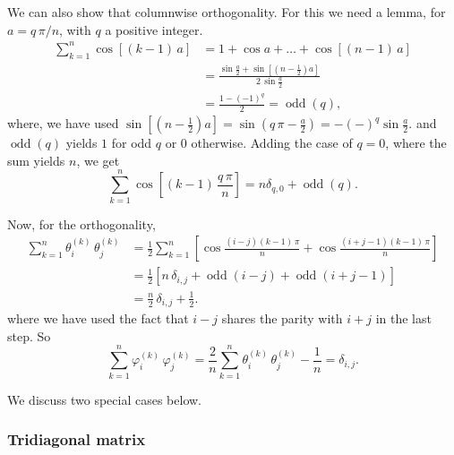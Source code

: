 \documentclass[reprint]{revtex4-1}
\begin{document}
{We can also show that columnwise orthogonality.
%
For this we need a lemma, for $a = q \, \pi/n$,
with $q$ a positive integer.
$$
\begin{aligned}
\sum_{k = 1}^n \cos[(k - 1) \, a]
&=
1 + \cos a + \dots + \cos[(n - 1) \, a]
\\
&=
\frac{
      \sin\frac a 2
    + \sin \left[ \left( n - \frac 1 2 \right) a \right]
    }
    {
      2 \, \sin \frac a 2
    }
\\
&=
\frac{ 1 - (-1)^q } { 2 }
= \operatorname{odd}(q),
\end{aligned}
$$
%
where, we have used
$\sin \left[ \left( n - \frac 1 2 \right) a \right]
= \sin \left( q \, \pi - \frac a 2 \right)
= -(-)^q\sin\frac a 2.$
%
and $\operatorname{odd}(q)$
yields $1$ for odd $q$ or $0$ otherwise.
%
Adding the case of $q = 0$, where the sum yields $n$,
we get
$$
\sum_{k = 1}^n \cos\left[(k - 1) \, \frac { q \, \pi } { n }  \right]
= n \delta_{q, 0} + \operatorname{odd}(q).
$$


Now, for the orthogonality,
$$
\begin{aligned}
  \sum_{k = 1}^n
  \theta^{(k)}_i \, \theta^{(k)}_j
  &=
  \frac 1 2
  \sum_{k = 1}^n
  \left[
    \cos \tfrac{ (i - j) (k - 1) \, \pi }
               {         n              }
    +
    \cos \tfrac{ (i + j - 1) (k - 1) \, \pi }
               {             n              }
  \right]
  \\
  &=
  \frac 1 2
  \left[
    n \, \delta_{i, j}
    +
    \operatorname{odd}(i - j)
    +
    \operatorname{odd}(i + j - 1)
  \right]
  \\
  &=
  \frac n 2 \, \delta_{i, j}
  + \frac 1 2.
\end{aligned}
$$
where we have used the fact
that $i - j$ shares the parity with $i + j$
in the last step.
%
So
$$
  \sum_{k = 1}^n
  \varphi^{(k)}_i \, \varphi^{(k)}_j
  =
  \frac 2 n
  \sum_{k = 1}^n
  \theta^{(k)}_i \, \theta^{(k)}_j
  -
  \frac 1 n
  =
  \delta_{i, j}.
$$
}
%
We discuss two special cases below.



\subsubsection{Tridiagonal matrix}
\end{document}
